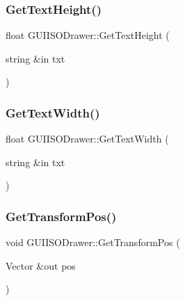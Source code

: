 \subsubsection{\texorpdfstring{Get\+Text\+Height()}{GetTextHeight()}}
{\footnotesize\ttfamily float G\+U\+I\+I\+S\+O\+Drawer\+::\+Get\+Text\+Height (\begin{DoxyParamCaption}\item[{string \&in}]{txt }\end{DoxyParamCaption})}

\hypertarget{class_g_u_i_i_s_o_drawer_a2986ffba04ac1ac1cac2bb8463d86688}{}\label{class_g_u_i_i_s_o_drawer_a2986ffba04ac1ac1cac2bb8463d86688} 
\subsubsection{\texorpdfstring{Get\+Text\+Width()}{GetTextWidth()}}
{\footnotesize\ttfamily float G\+U\+I\+I\+S\+O\+Drawer\+::\+Get\+Text\+Width (\begin{DoxyParamCaption}\item[{string \&in}]{txt }\end{DoxyParamCaption})}

\hypertarget{class_g_u_i_i_s_o_drawer_af8dde03018f10d559bdc283d818346b3}{}\label{class_g_u_i_i_s_o_drawer_af8dde03018f10d559bdc283d818346b3} 
\subsubsection{\texorpdfstring{Get\+Transform\+Pos()}{GetTransformPos()}}
{\footnotesize\ttfamily void G\+U\+I\+I\+S\+O\+Drawer\+::\+Get\+Transform\+Pos (\begin{DoxyParamCaption}\item[{Vector \&out}]{pos }\end{DoxyParamCaption})}

\hypertarget{class_g_u_i_i_s_o_drawer_a886ee169a052fb15d9aedf517e587aff}{}\label{class_g_u_i_i_s_o_drawer_a886ee169a052fb15d9aedf517e587aff} 
